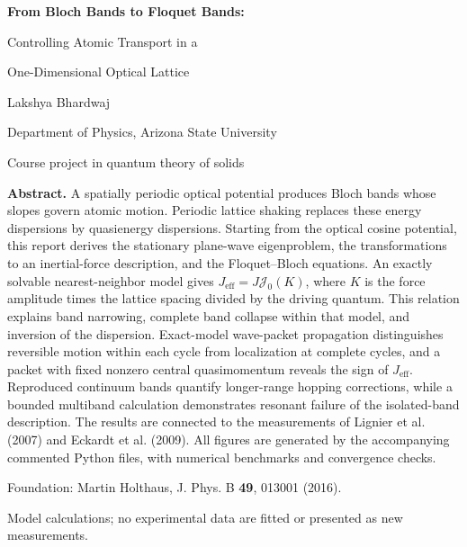 \documentclass[11pt,oneside]{report}
\numberwithin{equation}{chapter}
\newcommand{\Jeff}{J_{\mathrm{eff}}}
\begin{document}
\begin{titlepage}
\centering
\vspace*{1.0in}
{\LARGE\bfseries From Bloch Bands to Floquet Bands:\par}
\vspace{0.2in}
{\Large Controlling Atomic Transport in a\par One-Dimensional Optical Lattice\par}
\vspace{0.5in}
{\large Lakshya Bhardwaj\par}
{Department of Physics, Arizona State University\par}
\vspace{0.2in}
{Course project in quantum theory of solids\par}
\vspace{0.6in}
\begin{minipage}{0.87\textwidth}
\textbf{Abstract.} A spatially periodic optical potential produces Bloch bands whose slopes govern atomic motion. Periodic lattice shaking replaces these energy dispersions by quasienergy dispersions. Starting from the optical cosine potential, this report derives the stationary plane-wave eigenproblem, the transformations to an inertial-force description, and the Floquet--Bloch equations. An exactly solvable nearest-neighbor model gives $\Jeff=J\mathcal J_0(K)$, where $K$ is the force amplitude times the lattice spacing divided by the driving quantum. This relation explains band narrowing, complete band collapse within that model, and inversion of the dispersion. Exact-model wave-packet propagation distinguishes reversible motion within each cycle from localization at complete cycles, and a packet with fixed nonzero central quasimomentum reveals the sign of $\Jeff$. Reproduced continuum bands quantify longer-range hopping corrections, while a bounded multiband calculation demonstrates resonant failure of the isolated-band description. The results are connected to the measurements of Lignier et al. (2007) and Eckardt et al. (2009). All figures are generated by the accompanying commented Python files, with numerical benchmarks and convergence checks.
\end{minipage}
\vfill
{\small Foundation: Martin Holthaus, J. Phys. B \textbf{49}, 013001 (2016).\par}
{\small Model calculations; no experimental data are fitted or presented as new measurements.\par}
\end{titlepage}
\tableofcontents
\clearpage
\end{document}
